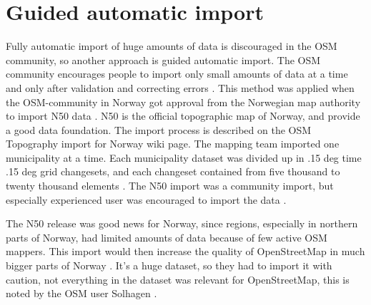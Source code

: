 
\section{Guided automatic import}\label{guidedautoimp}
Fully automatic import of huge amounts of data is discouraged in the OSM community, so another approach is guided automatic import. The OSM community encourages people to import only small amounts of data at a time and only after validation and correcting errors \cite{Mehus2014}. This method was applied when the OSM-community in Norway got approval from the Norwegian map authority to import N50 data \cite{Kihle2014}. N50 is the official topographic map of Norway, and provide a good data foundation. The import process is described on the OSM Topography import for Norway wiki page. The mapping team imported one municipality at a time. Each municipality dataset was divided up in .15 deg time .15 deg grid changesets, and each changeset contained from five thousand to twenty thousand elements \cite{OSMN502014}. The N50 import was a community import, but especially experienced user was encouraged to import the data \cite{Mehus2014}. 

The N50 release was good news for Norway, since regions, especially in northern parts of Norway, had limited amounts of data because of few active OSM mappers. This import would then increase the quality of OpenStreetMap in much bigger parts of Norway \cite{Jorgenrud2013}. It's a huge dataset, so they had to import it with caution, not everything in the dataset was relevant for OpenStreetMap, this is noted by the OSM user Solhagen \cite{Solhagen2015}. %

